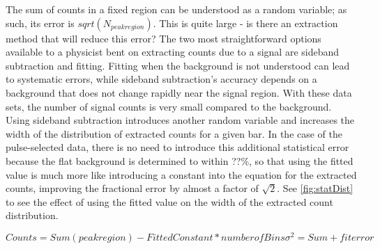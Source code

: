 The sum of counts in a fixed region can be understood as a random variable; as such, its error is $sqrt(N_{peakregion})$.  This is quite large - is there an extraction method that will reduce this error?  The two most straightforward options available to a physicist bent on extracting counts due to a signal are sideband subtraction and fitting.  Fitting when the background is not understood can lead to systematic errors, while sideband subtraction's accuracy depends on a background that does not change rapidly near the signal region.  With these data sets, the number of signal counts is very small compared to the background.  Using sideband subtraction introduces another random variable and increases the width of the distribution of extracted counts for a given bar.  In the case of the pulse-selected data, there is no need to introduce this additional statistical error because the flat background is determined to within ??\%, so that using the fitted value is much more like introducing a constant into the equation for the extracted counts, improving the fractional error by almost a factor of $\sqrt{2}$.  See \fig \ref{fig:statDist} to see the effect of using the fitted value on the width of the extracted count distribution.

\begin{equation}
Counts = Sum(peak region) - Fitted Constant * number of Bins
\sigma^2 = Sum + fit error
\label{eq:fitErr}
\end{equation}

